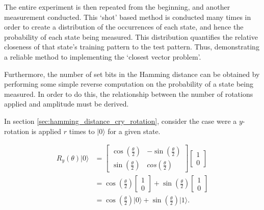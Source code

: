 The entire experiment is then repeated from the beginning, and another measurement conducted. This `shot' based method is conducted many times in order to create a distribution of the occurrences of each state, and hence the probability of each state being measured. This distribution quantifies the relative closeness of that state's training pattern to the test pattern. Thus, demonstrating a reliable method to implementing the `closest vector problem'.

Furthermore, the number of set bits in the Hamming distance can be obtained by performing some simple reverse computation on the probability of a state being measured. In order to do this, the relationship between the number of rotations applied and amplitude must be derived.

In section \ref{sec:hamming_distance_cry_rotation}, consider the case were a $y$-rotation is applied $r$ times to $\vert 0 \rangle$ for a given state.

\begin{align}
    R_y\left(\theta\right) \vert 0 \rangle &= 
    \begin{bmatrix}
        \cos\left(\frac{\theta}{2}\right) & -\sin\left(\frac{\theta}{2}\right)\\
        \sin\left(\frac{\theta}{2}\right) & cos\left(\frac{\theta}{2}\right)
    \end{bmatrix}
    \begin{bmatrix}
    1 \\ 0 
    \end{bmatrix}\\
    &= \cos\left(\frac{\theta}{2}\right)    
    \begin{bmatrix}
    1 \\ 0 
    \end{bmatrix}
    + \sin\left(\frac{\theta}{2}\right)
    \begin{bmatrix}
    1 \\ 0 
    \end{bmatrix}\\
    &= \cos\left(\frac{\theta}{2}\right) \vert 0 \rangle + \sin\left(\frac{\theta}{2}\right) \vert 1 \rangle.
    \label{eq:rotation_on_0}
\end{align}

